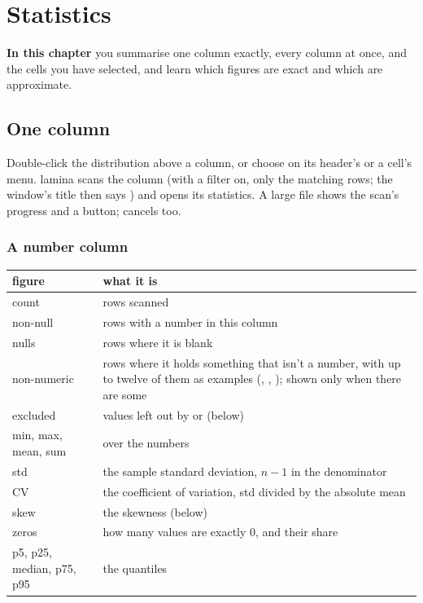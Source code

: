 \chapter{Statistics}\label{ch:stats}
\begin{goals}
\textbf{In this chapter} you summarise one column exactly, every column at once, and the cells you have
selected, and learn which figures are exact and which are approximate.
\end{goals}

\section{One column}\label{sec:one-column}

Double-click the distribution above a column, or choose  on its header's or a cell's
menu. lamina scans the column (with a filter on, only the matching rows; the window's title then says
) and opens its statistics. A large file shows the scan's progress and a 
button;  cancels too.


\subsection{A number column}

\begin{center}\small
\begin{tabularx}{\linewidth}{@{}lL@{}}
\toprule
\sffamily\bfseries figure & \sffamily\bfseries what it is \\
\midrule
count & rows scanned \\
non-null & rows with a number in this column \\
nulls & rows where it is blank \\
non-numeric & rows where it holds something that isn't a number, with up to twelve of them as examples
(, , \code{-}); shown only when there are some \\
excluded & values left out by  or  (below) \\
min, max, mean, sum & over the numbers \\
std & the sample standard deviation, $n-1$ in the denominator \\
CV & the coefficient of variation, std divided by the absolute mean \\
skew & the skewness (below) \\
zeros & how many values are exactly 0, and their share \\
p5, p25, median, p75, p95 & the quantiles \\
\bottomrule
\end{tabularx}
\end{center}

